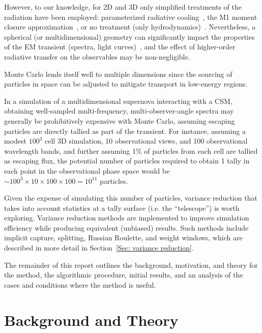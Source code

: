 \documentclass[]{article}
\begin{document}
  	 However, to our knowledge, for 2D and 3D only simplified treatments of the radiation have been employed: parameterized radiative cooling~\cite{MS10,MK12}, the M1 moment closure approximation~\cite{VL16}, or no treatment (only hydrodynamics)~\cite{MP18}. Nevertheless, a spherical (or multidimensional) geometry can significantly impact the properties of the EM transient (spectra, light curves)~\cite{VL16,MP18}, and the effect of higher-order radiative transfer on the observables may be non-negligible.

 	 Monte Carlo lends itself well to multiple dimensions since the sourcing of particles in space can be adjusted to mitigate transport in low-energy regions.
  
  	In a simulation of a multidimensional supernova interacting with a CSM, obtaining well-sampled multi-frequency, multi-observer-angle spectra may generally be prohibitively expensive with Monte Carlo, assuming escaping particles are directly tallied as part of the transient. For instance, assuming a modest $100^3$ cell 3D simulation, 10 observational views, and 100 observational wavelength bands, and further assuming 1\% of particles from each cell are tallied as escaping flux, the potential number of particles required to obtain 1 tally in each point in the observational phase space would be $\sim 100^3 \times 10 \times 100 \times 100 = 10^{11}$ particles.
  
  	Given the expense of simulating this number of particles, variance reduction that takes into account statistics at a tally surface (i.e. the ``telescope'') is worth exploring. Variance reduction methods are implemented to improve simulation efficiency while producing equivalent (unbiased) results. Such methods include implicit capture, splitting, Russian Roulette, and weight windows, which are described in more detail in Section~\ref{Sec: variance reduction}.
  
	The remainder of this report outlines the background, motivation, and theory for the method, the algorithmic procedure, initial results, and an analysis of the cases and conditions where the method is useful.

\section{Background and Theory}
\end{document}
